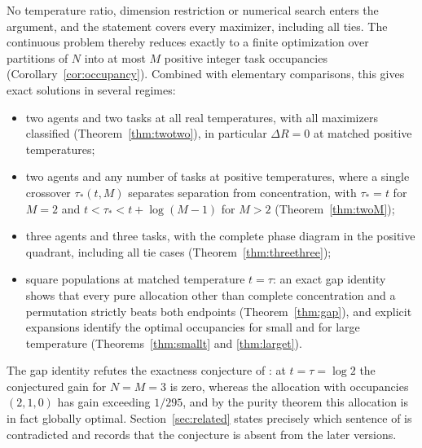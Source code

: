 \documentclass[11pt]{article}
\theoremstyle{plain}
\theoremstyle{definition}
\theoremstyle{remark}
\begin{document}
No temperature ratio, dimension restriction or numerical search enters the argument, and the statement covers every maximizer, including all ties. The continuous problem thereby reduces exactly to a finite optimization over partitions of $N$ into at most $M$ positive integer task occupancies (Corollary~\ref{cor:occupancy}). Combined with elementary comparisons, this gives exact solutions in several regimes:
\begin{itemize}[nosep]
\item two agents and two tasks at all real temperatures, with all maximizers classified (Theorem~\ref{thm:twotwo}), in particular $\Delta R=0$ at matched positive temperatures;
\item two agents and any number of tasks at positive temperatures, where a single crossover $\tau_*(t,M)$ separates separation from concentration, with $\tau_*=t$ for $M=2$ and $t<\tau_*<t+\log(M-1)$ for $M>2$ (Theorem~\ref{thm:twoM});
\item three agents and three tasks, with the complete phase diagram in the positive quadrant, including all tie cases (Theorem~\ref{thm:threethree});
\item square populations at matched temperature $t=\tau$: an exact gap identity shows that every pure allocation other than complete concentration and a permutation strictly beats both endpoints (Theorem~\ref{thm:gap}), and explicit expansions identify the optimal occupancies for small and for large temperature (Theorems~\ref{thm:smallt} and \ref{thm:larget}).
\end{itemize}
The gap identity refutes the exactness conjecture of \cite{ABPv1}: at $t=\tau=\log 2$ the conjectured gain for $N=M=3$ is zero, whereas the allocation with occupancies $(2,1,0)$ has gain exceeding $1/295$, and by the purity theorem this allocation is in fact globally optimal. Section~\ref{sec:related} states precisely which sentence of \cite{ABPv1} is contradicted and records that the conjecture is absent from the later versions.
\end{document}
